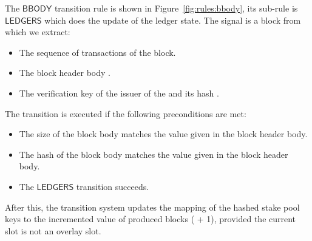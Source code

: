 The $\mathsf{BBODY}$ transition rule is shown in Figure~\ref{fig:rules:bbody},
its sub-rule is $\mathsf{LEDGERS}$ which does the update of the ledger
state. The signal is a block from which we extract:

\begin{itemize}
\item The sequence of transactions  of the block.
\item The block header body .
\item The verification key  of the issuer of the  and its
  hash .
\end{itemize}

The transition is executed if the following preconditions are met:

\begin{itemize}
\item The size of the block body matches the value given in the block header body.
\item The hash of the block body matches the value given in the block header body.
\item The $\mathsf{LEDGERS}$ transition succeeds.
\end{itemize}

After this, the transition system updates the mapping of the hashed stake pool
keys to the incremented value of produced blocks ( + 1), provided the
current slot is not an overlay slot.

